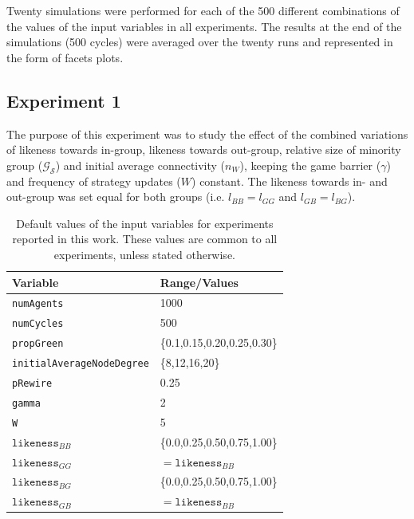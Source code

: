 Twenty simulations were performed for each of the 500 different combinations of the values of the input variables in all experiments. The results at the end of the simulations (500 cycles) were averaged over the twenty runs and represented in the form of facets plots.

\subsection{Experiment 1}
The purpose of this experiment was to study the effect of the combined variations of likeness towards in-group, likeness towards out-group, relative size of minority group ($ \mathcal{G}_{\mathcal{S}} $) and initial average connectivity ($ n_{W} $), keeping the game barrier ($ \gamma $) and frequency of strategy updates ($ W $) constant. The likeness towards in- and out-group was set equal for both groups (i.e. $ l_{BB} = l_{GG} $ and $ l_{GB} = l_{BG} $).
\begin{table}[t!] \centering
	\small
	\begin{tabular}{ll}
		\hline
		\textbf{Variable} & \textbf{Range/Values}    \\
		\hline
		\rule{0pt}{0ex} \texttt{numAgents}  & 1000 \\
		\rule{0pt}{4ex} \texttt{numCycles} & 500  \\                    
		\rule{0pt}{4ex} \texttt{propGreen} &  \{0.1,0.15,0.20,0.25,0.30\} \\
		\rule{0pt}{4ex} \texttt{initialAverageNodeDegree}  & \{8,12,16,20\}    \\
		\rule{0pt}{4ex} \texttt{pRewire} & 0.25 \\
		\rule{0pt}{4ex} \texttt{gamma} & 2 \\
		\rule{0pt}{4ex} \texttt{W} & 5 \\
		\rule{0pt}{4ex} $  $$ \texttt{likeness}_{BB} $   &  \{0.0,0.25,0.50,0.75,1.00\} \\
		\rule{0pt}{4ex} $ \texttt{likeness}_{GG} $   &   $ = \texttt{likeness}_{BB} $\\
		\rule{0pt}{4ex} $ \texttt{likeness}_{BG} $   &  \{0.0,0.25,0.50,0.75,1.00\} \\
		\rule{0pt}{4ex} $ \texttt{likeness}_{GB} $   &   $ = \texttt{likeness}_{BB} $\\
		\hline
	\end{tabular}
	\caption{Default values of the input variables for experiments reported in this work. These values are common to all experiments, unless stated otherwise.}
	\label{tab:Experiment1}
\end{table}


